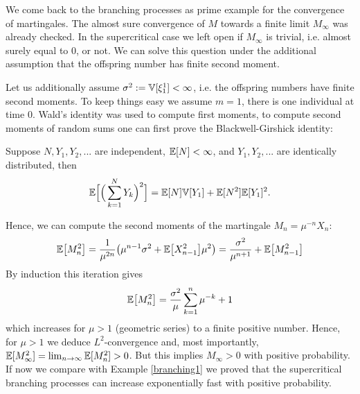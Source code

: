 	We come back to the branching processes as prime example for the convergence of martingales. The almost sure convergence of $M$ towards a finite limit $M_\infty$ was already checked. In the supercritical case we left open if $M_\infty$ is trivial, i.e. almost surely equal to $0$, or not. We can solve this question under the additional assumption that the offspring number has finite second moment.
\begin{example}\label{br2}
Let us additionally assume $\sigma^2:=\mathbb{V}[\xi_1^1]<\infty$, i.e. the offspring numbers have finite second moments. To keep things easy we assume $m=1$, there is one individual at time $0$. Wald's identity was used to compute first moments, to compute second moments of random sums one can first prove the Blackwell-Girshick identity:
	\begin{luebung}
		Suppose $N, Y_1,Y_2,...$ are independent, $\mathbb{E}[N]<\infty$, and $Y_1,Y_2,...$ are identically distributed, then
		\begin{align}\label{Wald2}
			\mathbb{E}\Big[\Big(\sum_{k=1}^N Y_k\Big)^2\Big]=\mathbb{E}[N]\mathbb{V}[Y_1]+\mathbb{E}[N^2]\mathbb{E}[Y_1]^2.
		\end{align}
	\end{luebung}
	Hence, we can compute the second moments of the martingale $M_n=\mu^{-n} X_n$:
	\begin{align*}
		\mathbb{E}\big[M_n^2\big]= \frac{1}{\mu^{2n}}\big(\mu^{n-1} \sigma^2+\mathbb{E}\big[X_{n-1}^2\big]\mu^2\big)=\frac{\sigma^2}{\mu^{n+1}} +\mathbb{E}\big[M_{n-1}^2\big]
	\end{align*}
	By induction this iteration gives
	\begin{align*}
		\mathbb{E}\big[ M_n^2\big]= \frac{\sigma^2}{\mu} \sum_{k=1}^{n} \mu^{-k} +1
	\end{align*}
	which increases for $\mu>1$ (geometric series) to a finite positive number. Hence, for $\mu>1$ we deduce $L^2$-convergence and, most importantly, $\mathbb{E}[M_\infty^2]=\lim_{n\to\infty} \mathbb{E}[M_n^2]>0$. But this implies $M_\infty>0$ with positive probability. If now we compare with Example \ref{branching1} we proved that the supercritical branching processes can increase exponentially fast with positive probability.

\end{example}



